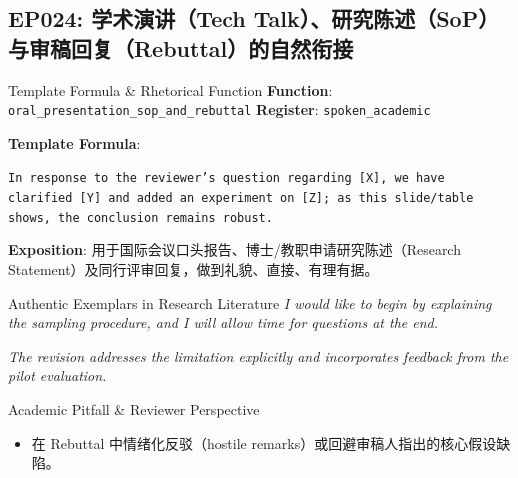 \subsection{EP024: 学术演讲（Tech Talk）、研究陈述（SoP）与审稿回复（Rebuttal）的自然衔接}\label{sec:ep:EP024}
\begin{ConceptBox}{Template Formula \& Rhetorical Function}
\textbf{Function}: \texttt{oral\_presentation\_sop\_and\_rebuttal} \quad \textbf{Register}: \texttt{spoken\_academic}\par\vspace{3pt}
\textbf{Template Formula}:\par\noindent\texttt{In response to the reviewer's question regarding [X], we have clarified [Y] and added an experiment on [Z]; as this slide/table shows, the conclusion remains robust.}\par\vspace{4pt}
\textbf{Exposition}: 用于国际会议口头报告、博士/教职申请研究陈述（Research Statement）及同行评审回复，做到礼貌、直接、有理有据。
\end{ConceptBox}
\begin{ExampleBox}{Authentic Exemplars in Research Literature}
\textit{I would like to begin by explaining the sampling procedure, and I will allow time for questions at the end.}\par\vspace{2pt}
\textit{The revision addresses the limitation explicitly and incorporates feedback from the pilot evaluation.}\par\vspace{2pt}
\end{ExampleBox}
\begin{TipBox}{Academic Pitfall \& Reviewer Perspective}
\begin{itemize}[leftmargin=1.5em, itemsep=1pt]
  \item 在 Rebuttal 中情绪化反驳（hostile remarks）或回避审稿人指出的核心假设缺陷。
\end{itemize}
\end{TipBox}
\vspace{6pt}